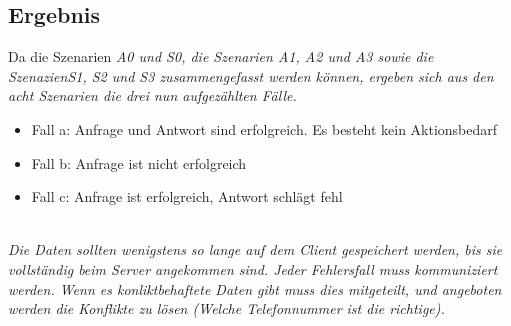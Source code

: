 \subsection*{Ergebnis}
Da die Szenarien \it{A0} und \it{S0}, die Szenarien \it{A1}, \it{A2} und \it{A3} sowie die Szenazien\it{S1}, \it{S2} und \it{S3} zusammengefasst werden können, ergeben sich aus den acht Szenarien die drei nun aufgezählten Fälle.
\begin{itemize}
  \item Fall a: Anfrage und Antwort sind erfolgreich. Es besteht kein Aktionsbedarf 
  \item Fall b: Anfrage ist nicht erfolgreich
  \item Fall c: Anfrage ist erfolgreich, Antwort schlägt fehl
\end{itemize}
\\
\it{Die Daten sollten wenigstens so lange auf dem Client gespeichert werden, bis sie vollständig beim Server angekommen sind. Jeder Fehlersfall muss kommuniziert werden. Wenn es konliktbehaftete Daten gibt muss dies mitgeteilt, und angeboten werden die Konflikte zu lösen (Welche Telefonnummer ist die richtige).}